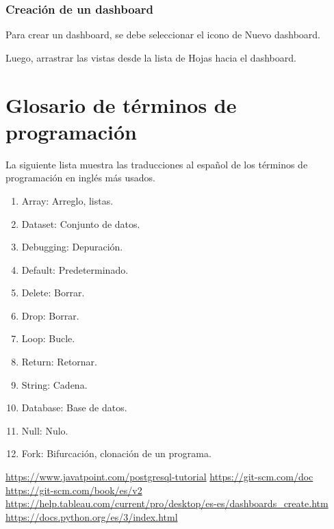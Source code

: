 \documentclass[a4paper, 12pt]{book}
\begin{document}
\subsection{Creación de un dashboard}
Para crear un dashboard, se debe seleccionar el icono de Nuevo dashboard.

Luego, arrastrar las vistas desde la lista de Hojas hacia el dashboard.

%
\chapter{Glosario de términos de programación}
La siguiente lista muestra las traducciones al español de los términos de programación en inglés más usados.
\begin{enumerate}
	\item Array: Arreglo, listas.
	\item Dataset: Conjunto de datos.
	\item Debugging: Depuración.
	\item Default: Predeterminado.
	\item Delete: Borrar.
	\item Drop: Borrar.
	\item Loop: Bucle.
	\item Return: Retornar.
	\item String: Cadena.
	\item Database: Base de datos.
	\item Null: Nulo.
	\item Fork: Bifurcación, clonación de un programa.
\end{enumerate} 

\begin{thebibliography}{0}
\bibitem{} \url{https://www.javatpoint.com/postgresql-tutorial} %
\bibitem{} \url{https://git-scm.com/doc} %
\bibitem{} \url{https://git-scm.com/book/es/v2} %
\bibitem{}  \url{https://help.tableau.com/current/pro/desktop/es-es/dashboards_create.htm}
\bibitem{} \url{https://docs.python.org/es/3/index.html}
\end{thebibliography}
\end{document}
